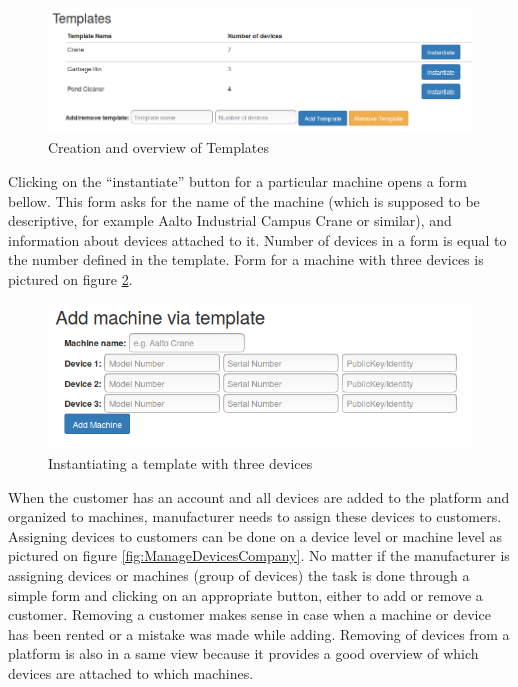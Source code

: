 \begin{figure}[ht]
	\begin{center}
		\includegraphics[width=\textwidth]{images/implementation/AddTemplate}
		\caption{Creation and overview of Templates}
		\label{fig:addTemplate}
	\end{center}
\end{figure}

Clicking on the ``instantiate'' button for a particular machine opens a form bellow. This form asks for the name of the machine (which is supposed to be descriptive, for example Aalto Industrial Campus Crane or similar), and information about devices attached to it. Number of devices in a form is equal to the number defined in the template. Form for a machine with three devices is pictured on figure \ref{fig:AddMachineViaTemplate}.

\begin{figure}[ht]
	\begin{center}
		\includegraphics[width=\textwidth]{images/implementation/AddMachineViaTemplate}
		\caption{Instantiating a template with three devices}
		\label{fig:AddMachineViaTemplate}
	\end{center}
\end{figure}

When the customer has an account and all devices are added to the platform and organized to machines, manufacturer needs to assign these devices to customers. Assigning devices to customers can be done on a device level or machine level as pictured on figure \ref{fig:ManageDevicesCompany}. No matter if the manufacturer is assigning devices or machines (group of devices) the task is done through a simple form and clicking on an appropriate button, either to add or remove a customer. Removing a customer makes sense in case when a machine or device has been rented or a mistake was made while adding. Removing of devices from a platform is also in a same view because it provides a good overview of which devices are attached to which machines.

